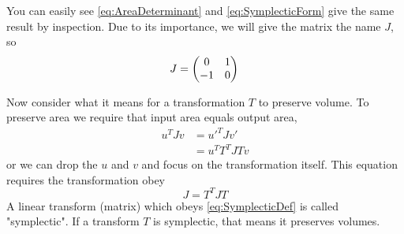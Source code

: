 \documentclass[hidelinks,notitlepage]{book}
\begin{document}
You can easily see \cref{eq:AreaDeterminant} and \cref{eq:SymplecticForm} give the same result by inspection.  Due to its importance, we will give the matrix the name $J$, so
\begin{equation}
\nonumber
J = 
\begin{pmatrix}
0 & 1 \\
-1 & 0
\end{pmatrix} \\
\end{equation}

Now consider what it means for a transformation $T$ to preserve volume.  To preserve area we require that input area equals output area,
\begin{align}
\nonumber
u^T J v &= u'^T J v' \\
\nonumber
&= u^T T^T J T v
\end{align}
or we can drop the $u$ and $v$ and focus on the transformation itself.  This equation requires the transformation obey
\begin{equation}
\label{eq:SymplecticDef}
J = T^T J T
\end{equation}
A linear transform (matrix) which obeys \cref{eq:SymplecticDef} is called "symplectic".  If a transform $T$ is symplectic, that means it preserves volumes.
\end{document}

